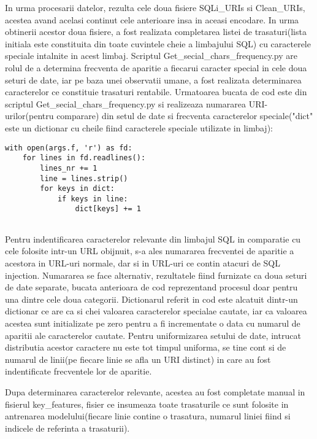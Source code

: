 In urma procesarii datelor, rezulta cele doua fisiere SQLi\_URIs si Clean\_URIs, acestea avand acelasi continut cele anterioare insa in aceasi encodare. In urma obtinerii acestor doua fisiere, a fost realizata completarea listei de trasaturi(lista initiala este constituita din toate cuvintele cheie a limbajului SQL) cu caracterele speciale intalnite in acest limbaj. Scriptul Get\_secial\_chars\_frequency.py are rolul de a determina frecventa de aparitie a fiecarui caracter special in cele doua seturi de date, iar pe baza unei observatii umane, a fost realizata determinarea caracterelor ce constituie trasaturi rentabile. Urmatoarea bucata de cod este din scriptul Get\_secial\_chars\_frequency.py si realizeaza numararea URI-urilor(pentru comparare) din setul de date si frecventa caracterelor speciale("dict" este un dictionar cu cheile fiind caracterele speciale utilizate in limbaj):
\lstset{language=python,frame=single, showstringspaces=false}
\begin{lstlisting}
with open(args.f, 'r') as fd:
    for lines in fd.readlines():
        lines_nr += 1
        line = lines.strip()
        for keys in dict:
            if keys in line:
                dict[keys] += 1
                
\end{lstlisting}

Pentru indentificarea caracterelor relevante din limbajul SQL in comparatie cu cele folosite intr-un URL obijnuit, s-a ales numararea frecventei de aparitie a acestora in URL-uri normale, dar si in URL-uri ce contin atacuri de SQL injection. Numararea se face alternativ, rezultatele fiind furnizate ca doua seturi de date separate, bucata anterioara de cod reprezentand procesul doar pentru una dintre cele doua categorii. Dictionarul referit in cod este alcatuit dintr-un dictionar ce are ca si chei valoarea caracterelor specialae cautate, iar ca valoarea acestea sunt initializate pe zero pentru a fi incrementate o data cu numarul de aparitii ale caracterelor cautate. Pentru uniformizarea setului de date, intrucat distributia acestor caractere nu este tot timpul uniforma, se tine cont si de numarul de linii(pe fiecare linie se afla un URI distinct) in care au fost indentificate frecventele lor de aparitie.

Dupa determinarea caracterelor relevante, acestea au fost completate manual in fisierul key\_features, fisier ce insumeaza toate trasaturile ce sunt folosite in antrenarea modelului(fiecare linie contine o trasatura, numarul liniei fiind si indicele de referinta a trasaturii).

